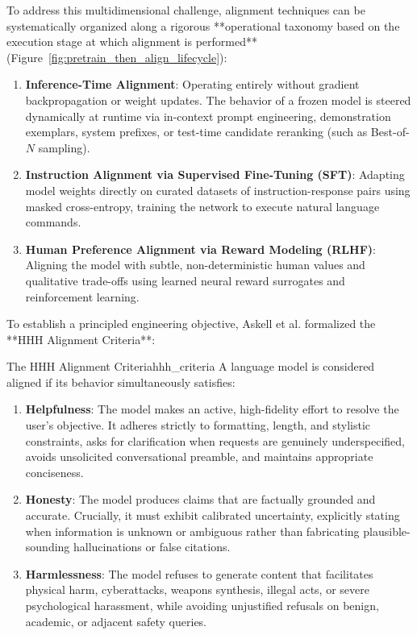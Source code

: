 \documentclass[../../../main.tex]{subfiles}
\begin{document}
To address this multidimensional challenge, alignment techniques can be systematically organized along a rigorous **operational taxonomy based on the execution stage at which alignment is performed** (Figure~\ref{fig:pretrain_then_align_lifecycle}):
\begin{enumerate}
    \item \textbf{Inference-Time Alignment}: Operating entirely without gradient backpropagation or weight updates. The behavior of a frozen model is steered dynamically at runtime via in-context prompt engineering, demonstration exemplars, system prefixes, or test-time candidate reranking (such as Best-of-$N$ sampling).
    \item \textbf{Instruction Alignment via Supervised Fine-Tuning (SFT)}: Adapting model weights directly on curated datasets of instruction-response pairs using masked cross-entropy, training the network to execute natural language commands.
    \item \textbf{Human Preference Alignment via Reward Modeling (RLHF)}: Aligning the model with subtle, non-deterministic human values and qualitative trade-offs using learned neural reward surrogates and reinforcement learning.
\end{enumerate}

To establish a principled engineering objective, Askell et al. \citep{askell2021} formalized the **HHH Alignment Criteria**:
\begin{definition}{The HHH Alignment Criteria}{hhh_criteria}
A language model is considered aligned if its behavior simultaneously satisfies:
\begin{enumerate}
    \item \textbf{Helpfulness}: The model makes an active, high-fidelity effort to resolve the user's objective. It adheres strictly to formatting, length, and stylistic constraints, asks for clarification when requests are genuinely underspecified, avoids unsolicited conversational preamble, and maintains appropriate conciseness.
    \item \textbf{Honesty}: The model produces claims that are factually grounded and accurate. Crucially, it must exhibit calibrated uncertainty, explicitly stating when information is unknown or ambiguous rather than fabricating plausible-sounding hallucinations or false citations.
    \item \textbf{Harmlessness}: The model refuses to generate content that facilitates physical harm, cyberattacks, weapons synthesis, illegal acts, or severe psychological harassment, while avoiding unjustified refusals on benign, academic, or adjacent safety queries.
\end{enumerate}
\end{definition}
\end{document}
